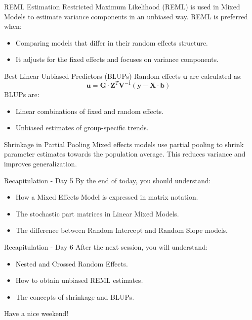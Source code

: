 \documentclass{beamer}
\begin{document}
\begin{frame}{REML Estimation}
Restricted Maximum Likelihood (REML) is used in Mixed Models to estimate variance components in an unbiased way. REML is preferred when:
\begin{itemize}
  \item Comparing models that differ in their random effects structure.
  \item It adjusts for the fixed effects and focuses on variance components.
\end{itemize}
\end{frame}

\begin{frame}{Best Linear Unbiased Predictors (BLUPs)}
Random effects $\mathbf{u}$ are calculated as:
\[
\mathbf{u} = \mathbf{G} \cdot \mathbf{Z}^T \mathbf{V}^{-1} (\mathbf{y} - \mathbf{X} \cdot \mathbf{b})
\]
BLUPs are:
\begin{itemize}
  \item Linear combinations of fixed and random effects.
  \item Unbiased estimates of group-specific trends.
\end{itemize}
\end{frame}

\begin{frame}{Shrinkage in Partial Pooling}
Mixed effects models use partial pooling to shrink parameter estimates towards the population average. This reduces variance and improves generalization.
\end{frame}

\begin{frame}{Recapitulation - Day 5}
By the end of today, you should understand:
\begin{itemize}
  \item How a Mixed Effects Model is expressed in matrix notation.
  \item The stochastic part matrices in Linear Mixed Models.
  \item The difference between Random Intercept and Random Slope models.
\end{itemize}
\end{frame}

\begin{frame}{Recapitulation - Day 6}
After the next session, you will understand:
\begin{itemize}
  \item Nested and Crossed Random Effects.
  \item How to obtain unbiased REML estimates.
  \item The concepts of shrinkage and BLUPs.
\end{itemize}
Have a nice weekend!
\end{frame}
\end{document}
